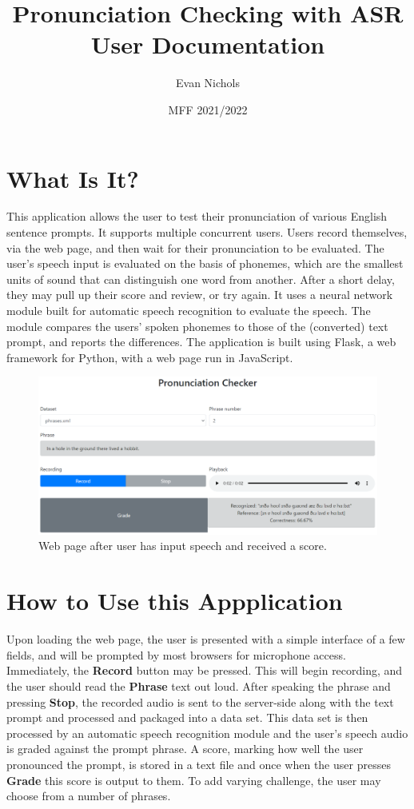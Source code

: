 \documentclass[12pt, letterpaper]{article}
\title{Pronunciation Checking with ASR\\ \small User Documentation}
\author{Evan Nichols}
\date{MFF 2021/2022}
\begin{document}
\maketitle

\section*{What Is It?}
This application allows the user to test their pronunciation of various English sentence prompts. It supports multiple concurrent users. Users record themselves, via the web page, and then wait for their pronunciation to be evaluated. The user's speech input is evaluated on the basis of phonemes, which are the smallest units of sound that can distinguish one word from another. After a short delay, they may pull up their score and review, or try again. It uses a neural network module built for automatic speech recognition to evaluate the speech. The module compares the users' spoken phonemes to those of the (converted) text prompt, and reports the differences. The application is built using Flask, a web framework for Python, with a web page run in JavaScript.

\begin{figure}[h!]
    \centering
    \includegraphics[width=1\textwidth]{images/results.pdf}
    \caption{Web page after user has input speech and received a score.}
\end{figure}


\newpage%
\section*{How to Use this Appplication}
Upon loading the web page, the user is presented with a simple interface of a few fields, and will be prompted by most browsers for microphone access. Immediately, the \textbf{Record} button may be pressed. This will begin recording, and the user should read the \textbf{Phrase} text out loud. After speaking the phrase and pressing \textbf{Stop}, the recorded audio is sent to the server-side along with the text prompt and processed and packaged into a data set. This data set is then processed by an automatic speech recognition module and the user's speech audio is graded against the prompt phrase. A score, marking how well the user pronounced the prompt, is stored in a text file and once when the user presses \textbf{Grade} this score is output to them. To add varying challenge, the user may choose from a number of phrases. 
\end{document}

